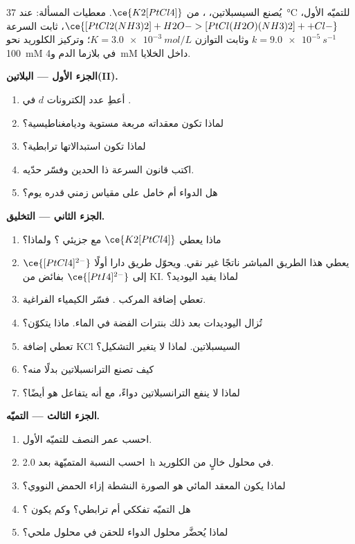 \begin{problem}
\label{pb:b3:complex-mechanisms:1}
يُصنع السيسبلاتين، ، من $\ce{K2[PtCl4]}$. معطيات المسألة: عند
\qty{37}{\celsius} للتميّه الأول، $\ce{[PtCl2(NH3)2] + H2O -> [PtCl(H2O)(NH3)2]+ + Cl-}$،
ثابت السرعة $k = \qty{9.0e-5}{s^{-1}}$ وثابت التوازن $K = \qty{3.0e-3}{mol/L}$؛ 
وتركيز الكلوريد نحو \qty{100}{mM} في بلازما الدم و\qty{4}{mM} داخل الخلايا.

\medskip\noindent\textbf{الجزء الأول --- البلاتين(II).}
\begin{enumerate}
  \item أعطِ عدد إلكترونات $d$ في .
  \item لماذا تكون معقداته مربعة مستوية وديامغناطيسية؟
  \item لماذا تكون استبدالاتها ترابطية؟
  \item اكتب قانون السرعة ذا الحدين وفسّر حدّيه.
  \item هل الدواء  أم خامل على مقياس زمني قدره يوم؟
\end{enumerate}

\medskip\noindent\textbf{الجزء الثاني --- التخليق.}
\begin{enumerate}[resume]
  \item ماذا يعطي $\ce{K2[PtCl4]}$ مع جزيئي ؟ ولماذا؟
  \item يعطي هذا الطريق المباشر ناتجًا غير نقي. ويحوّل طريق دارا أولًا
        $\ce{[PtCl4]^{2-}}$ إلى $\ce{[PtI4]^{2-}}$ بفائض من KI. لماذا يفيد اليوديد؟
  \item تعطي إضافة  المركب . فسّر الكيمياء الفراغية.
  \item تُزال اليوديدات بعد ذلك بنترات الفضة في الماء. ماذا يتكوّن؟
  \item تعطي إضافة KCl السيسبلاتين. لماذا لا يتغير التشكيل؟
  \item كيف تصنع الترانسبلاتين بدلًا منه؟
  \item لماذا لا ينفع الترانسبلاتين دواءً، مع أنه يتفاعل هو أيضًا؟
\end{enumerate}

\medskip\noindent\textbf{الجزء الثالث --- التميّه.}
\begin{enumerate}[resume]
  \item احسب عمر النصف للتميّه الأول.
  \item احسب النسبة المتميّهة بعد \qty{2.0}{h} في محلول خالٍ من الكلوريد.
  \item لماذا يكون المعقد المائي هو الصورة النشطة إزاء الحمض النووي؟
  \item هل التميّه تفككي أم ترابطي؟ وكم يكون ؟
  \item لماذا يُحضَّر محلول الدواء للحقن في محلول ملحي؟
\end{enumerate}


\end{problem}

